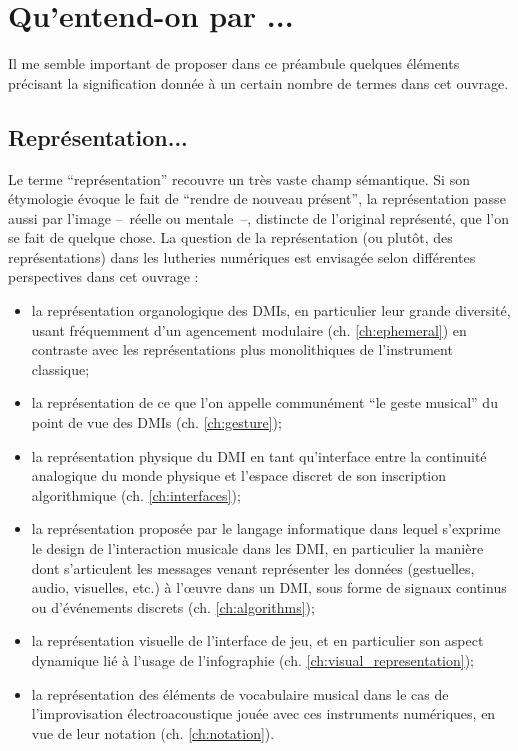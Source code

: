 \section{Qu'entend-on par ...}

\noindent Il me semble important de proposer dans ce préambule quelques éléments précisant la signification donnée à un certain nombre de termes dans cet ouvrage.

\subsection*{Représentation...}

\noindent Le terme ``représentation'' recouvre un très vaste champ sémantique. Si son étymologie évoque le fait de ``rendre de nouveau présent'', la représentation passe aussi par l'image --~réelle ou mentale~--, distincte de l'original représenté, que l'on se fait de quelque chose. La question de la représentation (ou plutôt, des représentations) dans les lutheries numériques est envisagée selon différentes perspectives dans cet ouvrage : 
\vspace{-1em}
\begin{itemize}[noitemsep]
\item la représentation organologique des \glspl{DMI}, en particulier leur grande diversité, usant fréquemment d'un agencement modulaire (ch. \ref{ch:ephemeral}) en contraste avec les représentations plus monolithiques de l'instrument classique;
\item la représentation de ce que l'on appelle communément ``le geste musical'' du point de vue des \glspl{DMI} (ch. \ref{ch:gesture});
\item la représentation physique du \gls{DMI} en tant qu'interface entre la continuité analogique du monde physique et l'espace discret de son inscription algorithmique (ch. \ref{ch:interfaces});
\item la représentation proposée par le langage informatique dans lequel s'exprime le design de l'interaction musicale dans les \gls{DMI}, en particulier la manière dont s'articulent les messages venant représenter les données (gestuelles, audio, visuelles, etc.) à l'œuvre dans un \gls{DMI}, sous forme de signaux continus ou d'événements discrets (ch. \ref{ch:algorithms});
\item la représentation visuelle de l'interface de jeu, et en particulier son aspect dynamique lié à l'usage de l'infographie (ch. \ref{ch:visual_representation});
\item la représentation des éléments de vocabulaire musical dans le cas de l'improvisation électroacoustique jouée avec ces instruments numériques, en vue de leur notation (ch. \ref{ch:notation}).
\end{itemize}

